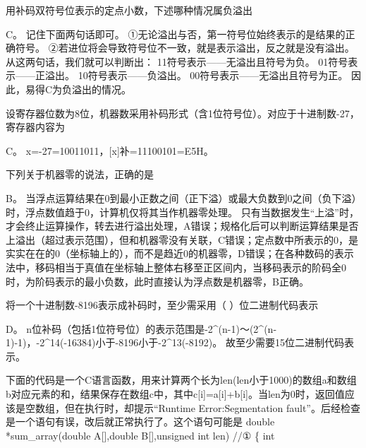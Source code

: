 \question 用补码双符号位表示的定点小数，下述哪种情况属负溢出
\par{}
\begin{solution}C。 记住下面两句话即可。
①无论溢出与否，第一符号位始终表示的是结果的正确符号。
②若进位将会导致符号位不一致，就是表示溢出，反之就是没有溢出。
从这两句话，我们就可以判断出： 11符号表示------无溢出且符号为负。
01符号表示------正溢出。 10符号表示------负溢出。
00符号表示------无溢出且符号为正。 因此，易得C为负溢出的情况。
\end{solution}
\question 设寄存器位数为8位，机器数采用补码形式（含1位符号位）。对应于十进制数-27，寄存器内容为
\par{}
\begin{solution}C。 x=-27=10011011，{[}x{]}补=11100101=E5H。
\end{solution}
\question 下列关于机器零的说法，正确的是
\par{}
\begin{solution}B。
当浮点运算结果在0到最小正数之间（正下溢）或最大负数到0之间（负下溢）时，浮点数值趋于0，计算机仅将其当作机器零处理。
只有当数据发生``上溢''时，才会终止运算操作，转去进行溢出处理，A错误；规格化后可以判断运算结果是否上溢出（超过表示范围），但和机器零没有关联，C错误；定点数中所表示的0，是实实在在的0（坐标轴上的），而不是趋近0的机器零，D错误；在各种数码的表示法中，移码相当于真值在坐标轴上整体右移至正区间内，当移码表示的阶码全0时，为阶码表示的最小负数，此时直接认为浮点数是机器零，B正确。
\end{solution}
\question 将一个十进制数-8196表示成补码时，至少需采用（ ）位二进制代码表示
\par{}
\begin{solution}D。
n位补码（包括1位符号位）的表示范围是-2\^{}(n-1)～(2\^{}(n-1)-1)，-2\^{}14(-16384)小于-8196小于-2\^{}13(-8192)。
故至少需要15位二进制代码表示。
\end{solution}
\question 下面的代码是一个C语言函数，用来计算两个长为len(len小于1000)的数组a和数组b对应元素的和，结果保存在数组c中，其中c{[}i{]}=a{[}i{]}+b{[}i{]}。当len为0时，返回值应该是空数组，但在执行时，却提示``Runtime
Error:Segmentation
fault''。后经检查是一个语句有误，改后就正常执行了。这个语句可能是 double
*sum\_array(double A{[}{]},double B{[}{]},unsigned int len) //① \{ int
